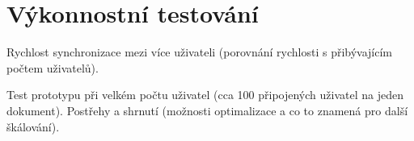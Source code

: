 
\section{Výkonnostní testování}\label{sec:systémovéTestování}

Rychlost synchronizace mezi více uživateli (porovnání rychlosti s přibývajícím počtem uživatelů).

Test prototypu při velkém počtu uživatel (cca 100 připojených uživatel na jeden dokument).
Postřehy a shrnutí (možnosti optimalizace a co to znamená pro další škálování).
